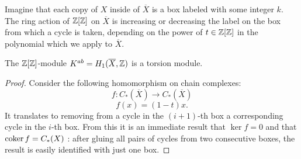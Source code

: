Imagine that each copy of $X$ inside of $\overline{X}$ is a box labeled with some integer $k$. The ring action of $\operatorname{\mathbb{Z}}[\operatorname{\mathbb{Z}}]$ on $\overline{X}$ is increasing or decreasing the label on the box from which a cycle is taken, depending on the power of $t\in\operatorname{\mathbb{Z}}[\operatorname{\mathbb{Z}}]$ in the polynomial which we apply to $\overline{X}$.

\begin{proposition}\label{prop: modul alexandera jest torsyjny}
  The $\operatorname{\mathbb{Z}}[\operatorname{\mathbb{Z}}]$-module $K^{ab}=H_1(\overline{X}, \operatorname{\mathbb{Z}})$ is a torsion module.
\end{proposition}

\begin{proof}
  Consider the following homomorphism on chain complexes:
  $$f:C_*(\overline{X})\to C_*(\overline{X})$$
  $$f(x)=(1-t)x.$$
  It translates to removing from a cycle in the $(i+1)$-th box a corresponding cycle in the $i$-th box. From this it is an immediate result that $\ker f=0$ and that $\operatorname{coker} f=C_*(X)$ : after gluing all pairs of cycles from two consecutive boxes, the result is easily identified with just one box.


\end{proof}
